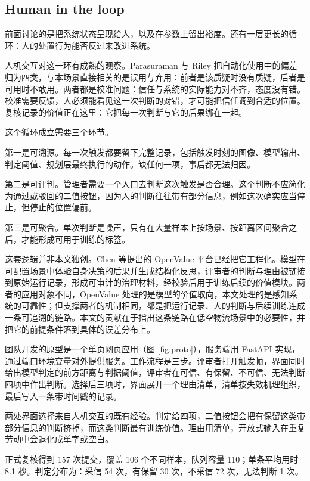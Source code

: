 \documentclass[12pt,a4paper]{ctexart}
\begin{document}
\subsection{Human in the loop}
\label{sec:hitl}

前面讨论的是把系统状态呈现给人，以及在参数上留出裕度。还有一层更长的循环：人的处置行为能否反过来改进系统。

人机交互对这一环有成熟的观察。Parasuraman 与 Riley 把自动化使用中的偏差归为四类，与本场景直接相关的是误用与弃用\cite{parasuraman}：前者是该质疑时没有质疑，后者是可用时不敢用。两者都是校准问题：信任与系统的实际能力对不齐，态度没有错。校准需要反馈，人必须能看见这一次判断的对错，才可能把信任调到合适的位置。复核记录的价值正在这里：它把每一次判断与它的后果绑在一起。

这个循环成立需要三个环节。

第一是可溯源。每一次触发都要留下完整记录，包括触发时刻的图像、模型输出、判定阈值、规划层最终执行的动作。缺任何一项，事后都无法归因。

第二是可评判。管理者需要一个入口去判断这次触发是否合理。这个判断不应简化为通过或驳回的二值按钮，因为人的判断往往带有部分信息，例如这次确实应当停止，但停止的位置偏前。

第三是可聚合。单次判断是噪声，只有在大量样本上按场景、按距离区间聚合之后，才能形成可用于训练的标签。

这套逻辑并非本文独创。Chen 等提出的 OpenValue 平台已经把它工程化。模型在可配置场景中体验自身决策的后果并生成结构化反思，评审者的判断与理由被链接到原始运行记录，形成可审计的治理材料，经校验后用于训练后续的价值模块\cite{openvalue}。两者的应用对象不同，OpenValue 处理的是模型的价值取向，本文处理的是感知系统的可靠性；但支撑两者的机制相同，都是把运行记录、人的判断与后续训练连成一条可追溯的链路。本文的贡献在于指出这条链路在低空物流场景中的必要性，并把它的前提条件落到具体的误差分布上。

团队开发的原型是一个单页网页应用（图 \ref{fig:proto}），服务端用 FastAPI 实现，通过端口环境变量对外提供服务。工作流程是三步。评审者打开触发帧，界面同时给出模型判定的前方距离与判据阈值，评审者在可信、有保留、不可信、无法判断四项中作出判断。选择后三项时，界面展开一个理由清单，清单按失效机理组织，最后写入一条带时间戳的记录。

两处界面选择来自人机交互的既有经验。判定给四项，二值按钮会把有保留这类带部分信息的判断挤掉，而这类判断最有训练价值。理由用清单，开放式输入在重复劳动中会退化成单字或空白。

正式复核得到 157 次提交，覆盖 106 个不同样本，队列容量 110；单条平均用时 8.1 秒。判定分布为：采信 54 次，有保留 30 次，不采信 72 次，无法判断 1 次。
\end{document}
